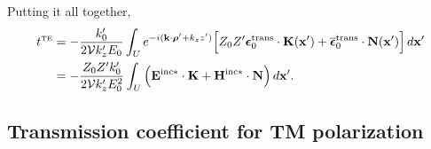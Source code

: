 \documentclass[letterpaper]{article}
\newcommand{\vbEps}{\boldsymbol{\epsilon}}
\begin{document}
Putting it all together, 
\begin{align*}
 t\supt{TE}
&=-\frac{k_0^\prime}{2\mc V k_z^\prime E_0}
   \int_U e^{-i(\vb k \cdot \vbrho^\prime + k_z z^\prime)}
        \Big[ Z_0 Z^\prime \vbEps_0\sups{trans} \cdot \vb K(\vb x^\prime)
                +\overline{\vbEps}_0\sups{trans} \cdot \vb N(\vb x^\prime)
        \Big] \, d\vb x^\prime
\\
&=-\frac{Z_0 Z^\prime k_0^\prime}{2\mc V k_z^\prime E_0^2}
   \int_U \Big(  \vb E^{\text{\scriptsize{inc}}*}\cdot \vb K
                +\vb H^{\text{\scriptsize{inc}}*}\cdot \vb N
          \Big) \, d\vb x^\prime.
\end{align*}

\subsection*{Transmission coefficient for TM polarization}
\end{document}

